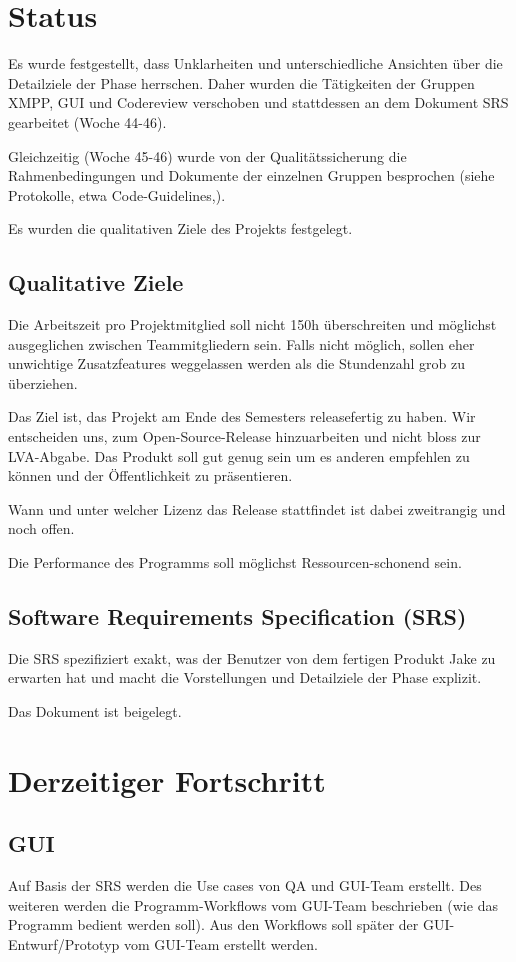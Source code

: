 \setcounter{chapter}{1}
\section{Status}
Es wurde festgestellt, dass Unklarheiten und unterschiedliche Ansichten über
die Detailziele der Phase herrschen. Daher wurden die Tätigkeiten der
Gruppen XMPP, GUI und Codereview verschoben und stattdessen an dem Dokument
SRS gearbeitet (Woche 44-46).

Gleichzeitig (Woche 45-46) wurde von der Qualitätssicherung die
Rahmenbedingungen und Dokumente der einzelnen Gruppen besprochen (siehe
Protokolle, etwa Code-Guidelines,).

Es wurden die qualitativen Ziele des Projekts festgelegt.

\subsection{Qualitative Ziele}
Die Arbeitszeit pro Projektmitglied soll nicht 150h überschreiten und
möglichst ausgeglichen zwischen Teammitgliedern sein. Falls nicht möglich,
sollen eher unwichtige Zusatzfeatures weggelassen werden als die Stundenzahl
grob zu überziehen.

Das Ziel ist, das Projekt am Ende des Semesters releasefertig zu haben. Wir
entscheiden uns, zum Open-Source-Release hinzuarbeiten und nicht bloss zur
LVA-Abgabe. Das Produkt soll gut genug sein um es anderen empfehlen zu
können und der Öffentlichkeit zu präsentieren.

Wann und unter welcher Lizenz das Release stattfindet ist dabei zweitrangig
und noch offen.

Die Performance des Programms soll möglichst Ressourcen-schonend sein.

\subsection{Software Requirements Specification (SRS)}
Die SRS spezifiziert exakt, was der Benutzer von dem fertigen Produkt Jake zu
erwarten hat und macht die Vorstellungen und Detailziele der Phase explizit.

Das Dokument ist beigelegt.

\section{Derzeitiger Fortschritt}
\subsection{GUI}
Auf Basis der SRS werden die Use cases von QA und GUI-Team erstellt. Des
weiteren werden die Programm-Workflows vom GUI-Team beschrieben (wie das
Programm bedient werden soll).
Aus den Workflows soll später der GUI-Entwurf/Prototyp vom GUI-Team erstellt
 werden.
